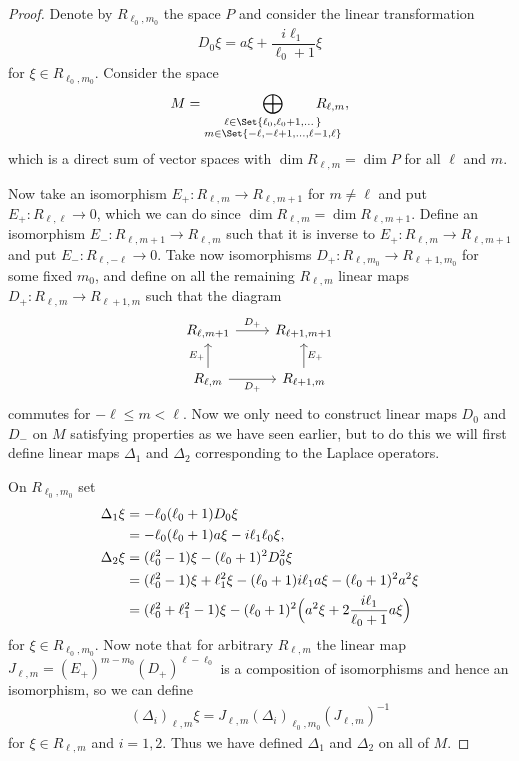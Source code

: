 \begin{proof}
  Denote by $R_{\ell_0,m_0}$ the space $P$ and consider the linear transformation
  \begin{align*}
    D_0 \xi = a\xi + \dfrac{i\ell_1}{\ell_0+1}\xi
  \end{align*}
  for $\xi\in R_{\ell_0,m_0}$. Consider the space
  \begin{align*}
    M = \bigoplus_{\substack{\ell\in\Set{\ell_0,\ell_0+1,\dotsc} \\ m\in\Set{-\ell,-\ell+1,\dotsc,\ell-1,\ell}}} \!\!\!\!\!\!\!\!\!\!\!\! R_{\ell,m},
  \end{align*}
  which is a direct sum of vector spaces with $\dim R_{\ell,m} = \dim P$ for all $\ell$ and $m$.

  Now take an isomorphism $E_+\colon R_{\ell,m}\to R_{\ell,m+1}$ for $m\neq \ell$ and put $E_+\colon R_{\ell,\ell}\to 0$, which we can do since $\dim R_{\ell,m}=\dim R_{\ell,m+1}$. Define an isomorphism $E_-\colon R_{\ell,m+1}\to R_{\ell,m}$ such that it is inverse to $E_+\colon R_{\ell,m}\to R_{\ell,m+1}$ and put $E_-\colon R_{\ell,-\ell}\to 0$. Take now isomorphisms $D_+\colon R_{\ell,m_0}\to R_{\ell+1,m_0}$ for some fixed $m_0$, and define on all the remaining $R_{\ell,m}$ linear maps $D_+\colon R_{\ell,m}\to R_{\ell+1,m}$ such that the diagram
  \[
    \begin{tikzcd}
      R_{\ell,m+1} \ar[r,"D_+"] & R_{\ell+1,m+1} \\
      R_{\ell,m}\ar[u,"E_+"] \ar[r,"D_+",swap] & R_{\ell+1,m}\ar[u,"E_+",swap]
    \end{tikzcd}
  \]
  commutes for $-\ell\leq m<\ell$. Now we only need to construct linear maps $D_0$ and $D_-$ on $M$ satisfying properties as we have seen earlier, but to do this we will first define linear maps $\Delta_1$ and $\Delta_2$ corresponding to the Laplace operators.

  On $R_{\ell_0,m_0}$ set 
  \begin{align}
    \begin{aligned}
      \Delta_1 \xi &= -\ell_0(\ell_0+1)D_0\xi \\
      &= -\ell_0(\ell_0+1)a\xi - i\ell_1\ell_0\xi, \\
      \Delta_2 \xi &= (\ell_0^2-1)\xi - (\ell_0+1)^2D_0^2\xi \\
      &= (\ell_0^2-1)\xi + \ell_1^2\xi - (\ell_0+1)i\ell_1a\xi - (\ell_0+1)^2a^2\xi \\
      &= (\ell_0^2+\ell_1^2-1)\xi - (\ell_0+1)^2\Bigl( a^2\xi + 2\dfrac{i\ell_1}{\ell_0+1}a\xi \Bigr)
    \end{aligned}
  \end{align}
  for $\xi \in R_{\ell_0,m_0}$. Now note that for arbitrary $R_{\ell,m}$ the linear map $J_{\ell,m}=(E_+)^{m-m_0}(D_+)^{\ell-\ell_0}$ is a composition of isomorphisms and hence an isomorphism, so we can define 
  \begin{align*}
    (\Delta_i)_{\ell,m}\xi = J_{\ell,m}(\Delta_i)_{\ell_0,m_0} (J_{\ell,m})^{-1}
  \end{align*}
  for $\xi\in R_{\ell,m}$ and $i=1,2$. Thus we have defined $\Delta_1$ and $\Delta_2$ on all of $M$.
  

\end{proof}
